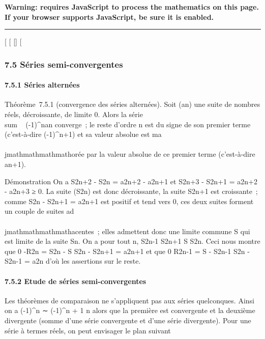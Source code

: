 \textbf{Warning: 
requires JavaScript to process the mathematics on this page.\\ If your
browser supports JavaScript, be sure it is enabled.}

\begin{center}\rule{3in}{0.4pt}\end{center}

{[}
{[}
{[}{]}
{[}

\subsubsection{7.5 Séries semi-convergentes}

\paragraph{7.5.1 Séries alternées}

Théorème~7.5.1 (convergence des séries alternées). Soit (an)
une suite de nombres réels, décroissante, de limite 0. Alors la série
\\sum ~
(-1)^nan converge~; le reste d'ordre n est du signe
de son premier terme (c'est-à-dire (-1)^n+1) et sa valeur
absolue est ma\\\\jmathmathmathmathorée par la valeur absolue de ce premier terme
(c'est-à-dire an+1).

Démonstration On a S2n+2 - S2n = a2n+2 -
a2n+1  et S2n+3 - S2n+1 =
a2n+2 - a2n+3 ≥ 0. La suite (S2n) est donc
décroissante, la suite S2n+1 est croissante~; comme
S2n - S2n+1 = a2n+1 est positif et tend
vers 0, ces deux suites forment un couple de suites ad\\\\jmathmathmathmathacentes~; elles
admettent donc une limite commune S qui est limite de la suite
Sn. On a pour tout n, S2n-1 \leq S2n+1 \leq S \leq
S2n. Ceci nous montre que 0 \leq-R2n = S2n -
S \leq S2n - S2n+1 = a2n+1 et que 0 \leq
R2n-1 = S - S2n-1 \leq S2n - S2n-1
= a2n d'où les assertions sur le reste.

\paragraph{7.5.2 Etude de séries semi-convergentes}

Les théorèmes de comparaison ne s'appliquent pas aux séries quelconques.
Ainsi on a  (-1)^n \over
\sqrtn ∼ (-1)^n \over
\sqrtn + 1 \over n alors que la
première est convergente et la deuxième divergente (somme d'une série
convergente et d'une série divergente). Pour une série à termes réels,
on peut envisager le plan suivant

